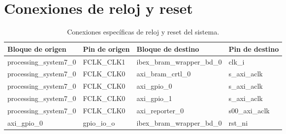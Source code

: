 \section{Conexiones de reloj y reset}
\begin{table}[!ht]
    \centering
    \caption{Conexiones específicas de reloj y reset del sistema.}
    \label{tab:clock_reset}
    \begin{tabular}{|l|l|l|l|}
    \hline
        Bloque de origen        & Pin de origen & Bloque de destino             & Pin de destino    \\ \hline
        processing\_system7\_0  & FCLK\_CLK1    & ibex\_bram\_wrapper\_bd\_0    & clk\_i            \\ \hline
        processing\_system7\_0  & FCLK\_CLK0    & axi\_bram\_crtl\_0            & s\_axi\_aclk      \\ \hline
        processing\_system7\_0  & FCLK\_CLK0    & axi\_gpio\_0                  & s\_axi\_aclk      \\ \hline
        processing\_system7\_0  & FCLK\_CLK0    & axi\_gpio\_1                  & s\_axi\_aclk      \\ \hline
        processing\_system7\_0  & FCLK\_CLK0    & axi\_reporter\_0              & s00\_axi\_aclk    \\ \hline
        axi\_gpio\_0            & gpio\_io\_o   & ibex\_bram\_wrapper\_bd\_0    & rst\_ni           \\ \hline
    \end{tabular}
\end{table}



